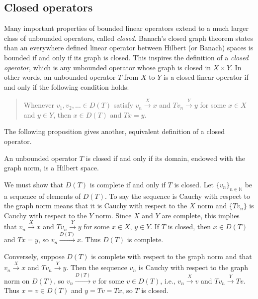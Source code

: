\subsection{{Closed operators}}\label{sec:closed-operators}

{Many important properties of bounded linear operators extend to a much larger class of unbounded operators, called \emph{closed}. Banach's closed graph theorem states than an everywhere defined linear operator between Hilbert (or Banach) spaces is bounded if and only if its graph is closed. This inspires the definition of a \emph{closed operator}, which is any unbounded operator whose graph is closed in $X\times Y$. In other words, an unbounded operator $T$ from $X$ to $Y$ is a closed linear operator if and only if the following condition holds:}

\begin{quote}
{Whenever $v_1,v_2,\ldots\in D(T)$ satisfy $v_n\xrightarrow{X}x$ and $Tv_n\xrightarrow{Y}y$ for some $x\in X$ and $y\in Y$, then $x\in D(T)$ and $Tx=y$.}
\end{quote}

{The following proposition gives another, equivalent definition of a closed operator.}

\begin{Proposition}\label{prop:closed-graph-domain-complete}
{An unbounded operator $T$ is closed if and only if its domain, endowed with the graph norm, is a Hilbert space.}
\end{Proposition}

\begin{Proof}
{We must show that $D(T)$ is complete if and only if $T$ is closed. Let $\{v_n\}_{n\in\mathbb N}$ be a sequence of elements of $D(T)$. To say the sequence is Cauchy with respect to the graph norm means that it is Cauchy with respect to the $X$ norm and $\{Tv_n\}$ is Cauchy with respect to the $Y$ norm. Since $X$ and $Y$ are complete, this implies that $v_n\xrightarrow{X}x$ and $Tv_n\xrightarrow{Y}y$ for some $x\in X$, $y\in Y$. If $T$ is closed, then $x\in D(T)$ and $Tx=y$, so $v_n\xrightarrow{D(T)}x$. Thus $D(T)$ is complete.}

{Conversely, suppose $D(T)$ is complete with respect to the graph norm and that $v_n\xrightarrow{X}x$ and $Tv_n\xrightarrow{Y}y$. Then the sequence $v_n$ is Cauchy with respect to the graph norm on $D(T)$, so $v_n\xrightarrow{D(T)}v$ for some $v\in D(T)$, i.e., $v_n\xrightarrow{X}v$ and $Tv_n\xrightarrow{Y}Tv$. Thus $x=v\in D(T)$ and $y=Tv=Tx$, so $T$ is closed.}
\end{Proof}

